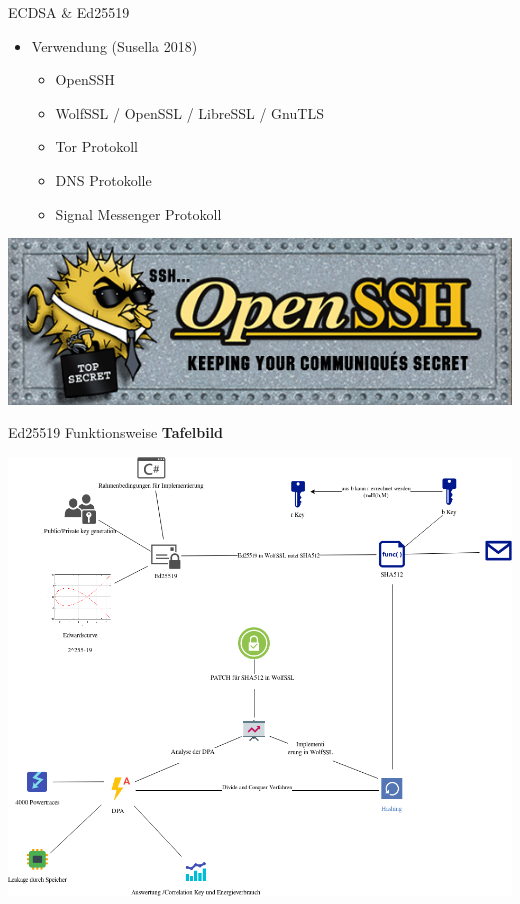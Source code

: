 \begin{frame}{ECDSA \& Ed25519}
\protect\hypertarget{ecdsa-ed25519-1}{}
\begin{itemize}
\tightlist
\item
  Verwendung (Susella 2018)

  \begin{itemize}
  \tightlist
  \item
    OpenSSH
  \item
    WolfSSL / OpenSSL / LibreSSL / GnuTLS
  \item
    Tor Protokoll
  \item
    DNS Protokolle
  \item
    Signal Messenger Protokoll
  \end{itemize}
\end{itemize}

\includegraphics[width=\textwidth,height=0.5\textheight]{Abbildungen/openssh.png}
\end{frame}

\begin{frame}{Ed25519 Funktionsweise}
\protect\hypertarget{ed25519-funktionsweise}{}
\textbf{Tafelbild}
\end{frame}

\begin{frame}{}
\protect\hypertarget{section-2}{}
\includegraphics{Abbildungen/ITSEC(1).png}
\end{frame}

